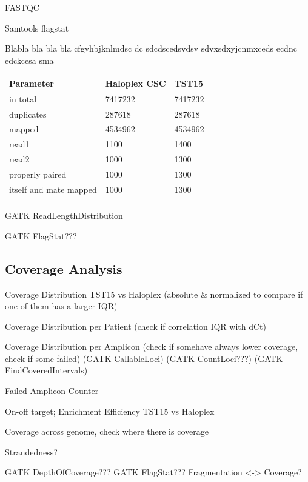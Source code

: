 FASTQC

Samtools flagstat

{\lipsum[2]

\begin{minipage}{0.5\textwidth}
Blabla bla bla bla cfgvhbjknlmdsc
dc
sdcdscedsvdsv
sdvxsdxyjcnmxceds ecdnc edckcesa sma
\end{minipage}
\hfill
\begin{minipage}{0.5\textwidth}
\begin{tabular}{p{3cm} p{1.5cm} p{1.5cm}}\\
\hline
Parameter & Haloplex CSC & TST15 \\
\hline
in total & 7417232 & 7417232 \\
duplicates & 287618 & 287618 \\
mapped & 4534962 & 4534962 \\
read1 & 1100 & 1400 \\
read2 & 1000 & 1300 \\
properly paired & 1000 & 1300  \\
itself and mate mapped & 1000 & 1300  \\
\label{bla}
\end{tabular}
\end{minipage}


{\lipsum[2]

GATK ReadLengthDistribution

GATK FlagStat???

\subsection{Coverage Analysis}

Coverage Distribution TST15 vs Haloplex (absolute & normalized to compare if one of them has a larger IQR)

Coverage Distribution per Patient (check if correlation IQR with dCt)

Coverage Distribution per Amplicon (check if somehave always lower coverage, check if some failed)
(GATK CallableLoci)
(GATK CountLoci???)
(GATK FindCoveredIntervals)

Failed Amplicon Counter

On-off target; Enrichment Efficiency TST15 vs Haloplex

Coverage across genome, check where there is coverage

Strandedness?

GATK DepthOfCoverage???
GATK FlagStat???
Fragmentation <-> Coverage?


}}
